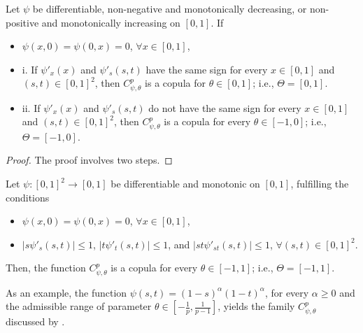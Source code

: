 \documentclass[twoside]{article}
\numberwithin{equation}{section}
\begin{document}
\begin{thm}\label{th1}
Let $\psi$ be differentiable, non-negative and monotonically decreasing, or non-positive and monotonically increasing on $[0,1]$. If
\begin{itemize}
\item[A1.] $\psi(x,0)=\psi(0,x)=0$, $\forall x \in [0,1]$,
\item[A2.] i. If $\psi'_x(x)$ and $\psi'_s(s,t)$ have the same sign for every $x \in [0,1]$ and $(s,t) \in [0,1]^2$, then $C_{\psi,\theta}^p$ is a copula for $\theta \in [0, 1]$; i.e., $\Theta = [0, 1]$.
\item[] ii. If $\psi'_x(x)$ and $\psi'_s(s,t)$ do not have the same sign for every $x \in [0,1]$ and $(s,t) \in [0,1]^2$, then $C_{\psi,\theta}^p$ is a copula for every $\theta \in [-1, 0]$; i.e., $\Theta = [-1, 0]$.
\end{itemize}
\end{thm}
\begin{proof}
The proof involves two steps.
\end{proof}

\begin{cor}\label{cor1}
Let $\psi: [0,1]^2 \to [0,1]$ be differentiable and monotonic on $[0,1]$, fulfilling the conditions
\begin{itemize}
\item[B1.] $\psi(x,0)=\psi(0,x)=0$, $\forall x \in [0,1]$,
\item[B2.] $|s \psi'_s(s,t)| \le 1$, $|t \psi'_t(s,t)| \le 1$, and $|st \psi'_{st}(s,t)| \le 1$, $\forall (s,t) \in [0,1]^2$.
\end{itemize}
Then, the function $C_{\psi,\theta}^p$ is a copula for every $\theta \in [-1, 1]$; i.e., $\Theta = [-1, 1]$.
\end{cor}

As an example, the function $\psi(s,t) = (1-s)^\alpha (1-t)^\alpha$, for every $\alpha \ge 0$ and the admissible range of parameter $\theta \in \left[-\frac{1}{p}, \frac{1}{p-1}\right]$, yields the family $C_{\psi,\theta}^p$ discussed by \cite{Bekrizadeh2012}.
\end{document}
